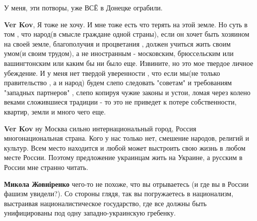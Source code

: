 \begin{itemize}
\begin{itemize}
 
У меня, эти потворы, уже ВСЁ в Донецке ограбили.

 
\textbf{Ver Kov}, Я тоже не хочу. И мне тоже есть что терять на этой земле. Но
суть в том , что народ(в смысле граждане одной страны), если он хочет быть
хозяином на своей земле, благополучия и процветания , должен учиться жить своим
умом(и своим трудом), а не иностранным - московским, брюссельским или
вашингтонским или каким бы ни было еще. Извините, но это мое твердое личное
убеждение. И у меня нет твердой уверенности , что если мы(не только
правительство , а и народ) будем слепо следовать "советам" и требованиям
"западных партнеров" , слепо копируя чужие законы и устои, ломая через колено
веками сложившиеся традиции - то это не приведет к потере собственности,
квартир, земли и много чего еще.

 
\textbf{Ver Kov} ну Москва сильно интернациональный город, Россия
многонациональная страна. Кого у нас только нет, смешение народов, религий и
культур. Всем место находится и любой может выстроить свою жизнь в любом месте
России. Поэтому предложение украинцам жить на Украине, а русским в России мне
странно читать.

 
\textbf{Микола Жовніренко} чего-то не похоже, что вы отрываетесь (и где вы в
России фашизм увидели?). Со стороны глядя, так вы погружаетесь в национализм,
выстраивая националистическое государство, где все должны быть унифицированы
под одну западно-украинскую гребенку.


\end{itemize}
\end{itemize}
